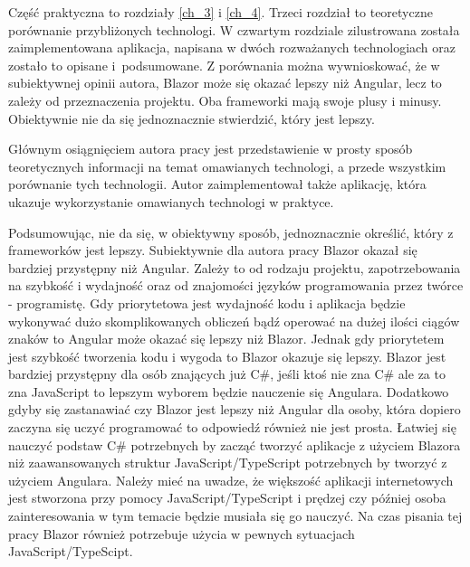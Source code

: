 \documentclass[12pt,a4paper,oneside]{book}
\begin{document}
Część praktyczna to rozdziały \ref{ch_3} i \ref{ch_4}. Trzeci rozdział to teoretyczne porównanie przybliżonych technologi. W czwartym rozdziale zilustrowana została zaimplementowana aplikacja, napisana w dwóch rozważanych technologiach oraz zostało to opisane i~podsumowane. Z porównania można wywnioskować, że w subiektywnej opinii autora, Blazor może się okazać lepszy niż Angular, lecz to zależy od przeznaczenia projektu. Oba frameworki mają swoje plusy i minusy. Obiektywnie nie da się jednoznacznie stwierdzić, który jest lepszy. 

Głównym osiągnięciem autora pracy jest przedstawienie w prosty sposób teoretycznych informacji na temat omawianych technologi, a przede wszystkim porównanie tych technologii. Autor zaimplementował także aplikację, która ukazuje wykorzystanie omawianych technologi w praktyce.

Podsumowując, nie da się, w obiektywny sposób, jednoznacznie określić, który z frameworków jest lepszy. Subiektywnie dla autora pracy Blazor okazał się bardziej przystępny niż Angular. Zależy to od rodzaju projektu, zapotrzebowania na szybkość i wydajność oraz od znajomości języków programowania przez twórce - programistę. Gdy priorytetowa jest wydajność kodu i aplikacja będzie wykonywać dużo skomplikowanych obliczeń bądź operować na dużej ilości ciągów znaków to Angular może okazać się lepszy niż Blazor. Jednak gdy priorytetem jest szybkość tworzenia kodu i wygoda to Blazor okazuje się lepszy. Blazor jest bardziej przystępny dla osób znających już C\#, jeśli ktoś nie zna C\# ale za to zna JavaScript to lepszym wyborem będzie nauczenie się Angulara. Dodatkowo gdyby się zastanawiać czy Blazor jest lepszy niż Angular dla osoby, która dopiero zaczyna się uczyć programować to odpowiedź również nie jest prosta. Łatwiej się nauczyć podstaw C\# potrzebnych by zacząć tworzyć aplikacje z użyciem Blazora niż zaawansowanych struktur JavaScript/TypeScript potrzebnych by tworzyć z użyciem Angulara. Należy mieć na uwadze, że większość aplikacji internetowych jest stworzona przy pomocy JavaScript/TypeScript i prędzej czy później osoba zainteresowania w tym temacie będzie musiała się go nauczyć. Na czas pisania tej pracy Blazor również potrzebuje użycia w pewnych sytuacjach JavaScript/TypeScipt.

\appendix
\end{document}
